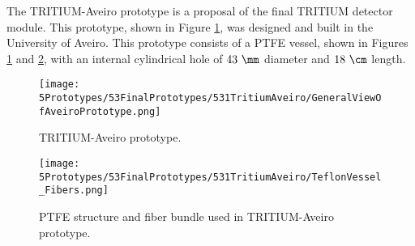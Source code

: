 The TRITIUM-Aveiro prototype is a proposal of the final TRITIUM detector module. This prototype, shown in Figure \ref{fig:TritiumAveiro0}, was designed and built in the University of Aveiro. This prototype consists of a PTFE vessel, shown in Figures \ref{fig:TritiumAveiro0} and \ref{fig:TeflonStructureFibersTritiumAveiro0}, with an internal cylindrical hole of $43~\mm$ diameter and $18~\cm$ length.

\begin{figure}[h]
\centering
\texttt{[image: 5Prototypes/53FinalPrototypes/531TritiumAveiro/GeneralViewOfAveiroPrototype.png]}
\caption{TRITIUM-Aveiro prototype.\label{fig:TritiumAveiro0}}
\end{figure}
 
\begin{figure}[h]
\centering
\texttt{[image: 5Prototypes/53FinalPrototypes/531TritiumAveiro/TeflonVessel\_Fibers.png]}
\caption{PTFE structure and fiber bundle used in TRITIUM-Aveiro prototype.\label{fig:TeflonStructureFibersTritiumAveiro0}}
\end{figure}

